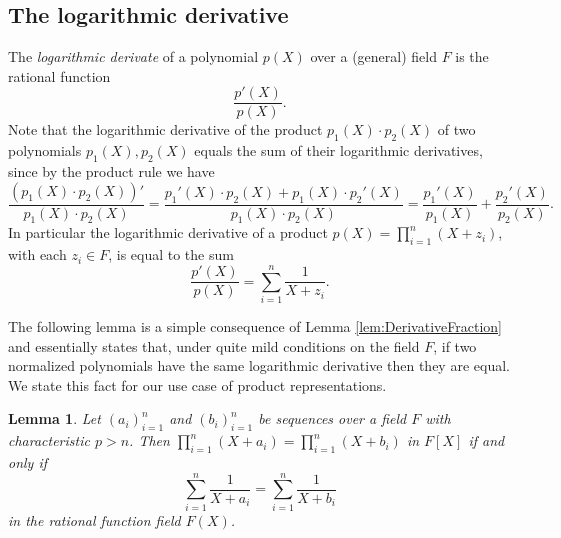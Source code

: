 \documentclass[11pt]{article}
\newtheorem{lem}[]{Lemma}
\theoremstyle{definition}
\theoremstyle{remark}
\begin{document}
\subsection{The  logarithmic derivative}

The \textit{logarithmic derivate} of a polynomial $p(X)$ over a (general) field $F$ is the rational function
\begin{equation*}
\frac{p'(X)}{p(X)}.
\end{equation*}
Note that the logarithmic derivative of the product $p_1(X)\cdot p_2(X)$ of two polynomials $p_1(X), p_2(X)$ equals the sum of their logarithmic derivatives, since by the product rule we have 
\[
\frac{(p_1(X)\cdot p_2(X))'}{p_1(X)\cdot p_2(X)} = \frac{p_1'(X)\cdot p_2(X) + p_1(X)\cdot p_2'(X)}{p_1(X)\cdot p_2(X)} 
= \frac{p_1'(X)}{p_1(X)} + \frac{p_2'(X)}{p_2(X)}.
\]
In particular the logarithmic derivative of a product $p(X) = \prod_{i=1}^n (X + z_i)$, with each $z_i\in F$, is equal to the sum
\begin{equation}
\label{e:LogDerivativeProduct}
\frac{p'(X)}{p(X)} %
= \sum_{i=1}^n \frac{1}{X + z_i}.
\end{equation}

The following lemma is a simple consequence of Lemma \ref{lem:DerivativeFraction} and essentially states that, under quite mild conditions on the field $F$, if two normalized polynomials have the same logarithmic derivative then they are equal. 
We state this fact for our use case of product representations.
\begin{lem}
\label{lem:LogarithmicDerivative}
Let $(a_i)_{i=1}^n$ and $(b_i)_{i=1}^n$ be sequences  over a field $F$ with characteristic $p > n$. 
Then
$
\prod_{i=1}^n \left(X + a_i \right) =\prod_{i=1}^n \left(X + b_i \right)
$
in $F[X]$ if and only if  
\begin{equation*}
\sum_{i=1}^n \frac{1}{X + a_i} =\sum_{i=1} ^n\frac{1}{X + b_i}
\end{equation*}
in the rational function field $F(X)$.
\end{lem}
\end{document}
